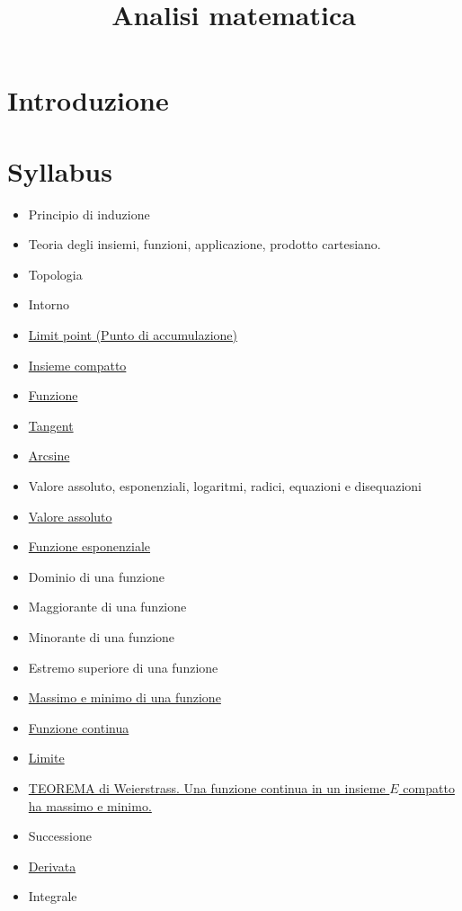 \documentclass[a4paper,10pt]{article}
\title{Analisi matematica}
\author{}
\begin{document}
\maketitle


\section{Introduzione}

\section{Syllabus}
\begin{itemize}
 \item Principio di induzione
 \item Teoria degli insiemi, funzioni, applicazione, prodotto cartesiano.
 \item Topologia
 \item Intorno
 \item \href{LimitPoint.html}{Limit point (Punto di accumulazione)}
 \item \href{InsiemeCompatto.html}{Insieme compatto}
 \item \href{Function.html}{Funzione}
 \item \href{Tangent.html}{Tangent}
 \item \href{Arcsine.html}{Arcsine}
 \item Valore assoluto, esponenziali, logaritmi, radici, equazioni e disequazioni
 \item \href{./ValoreAssoluto.html}{Valore assoluto}
 \item \href{./FunzioneEsponenziale.html}{Funzione esponenziale}
 \item Dominio di una funzione
 \item Maggiorante di una funzione
 \item Minorante di una funzione
 \item Estremo superiore di una funzione
 \item \href{FunzioneMassimoMinimo.html}{Massimo e minimo di una funzione}
 \item \href{FunzioneContinua.html}{Funzione continua}
 \item \href{Limite.html}{Limite}
 \item \href{Weierstrass.html}{TEOREMA di Weierstrass. Una funzione continua in un insieme $E$ compatto ha massimo e minimo.}
 \item Successione
 \item \href{Derivata.html}{Derivata} 
 \item Integrale
\end{itemize}
\end{document}
